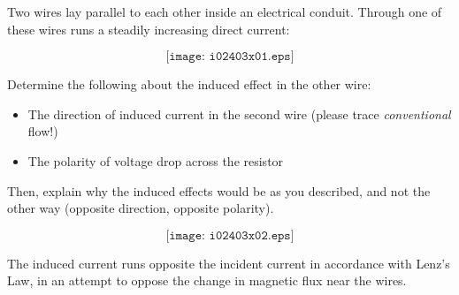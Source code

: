 

Two wires lay parallel to each other inside an electrical conduit.  Through one of these wires runs a steadily increasing direct current:

$$\texttt{[image: i02403x01.eps]}$$

Determine the following about the induced effect in the other wire:

\begin{itemize}
\item{} The direction of induced current in the second wire (please trace {\it conventional} flow!)
\vskip 10pt
\item{} The polarity of voltage drop across the resistor
\end{itemize}

Then, explain why the induced effects would be as you described, and not the other way (opposite direction, opposite polarity).







$$\texttt{[image: i02403x02.eps]}$$

The induced current runs opposite the incident current in accordance with Lenz's Law, in an attempt to oppose the change in magnetic flux near the wires.











